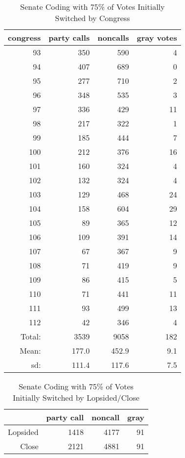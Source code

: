 \documentclass[12pt]{article}
\begin{document}
\begin{table}[ht]
	\centering
	\caption{Senate Coding with 75\% of Votes Initially Switched by Congress}
	\begin{tabular}{rrrr}
		\hline
		congress & party calls & noncalls & gray votes \\
		\hline
		93 & 350 & 590 &   4 \\
		94 & 407 & 689 &   0 \\
		95 & 277 & 710 &   2 \\
		96 & 348 & 535 &   3 \\
		97 & 336 & 429 &  11 \\
		98 & 217 & 322 &   1 \\
		99 & 185 & 444 &   7 \\
		100 & 212 & 376 &  16 \\
		101 & 160 & 324 &   4 \\
		102 & 132 & 324 &   4 \\
		103 & 129 & 468 &  24 \\
		104 & 158 & 604 &  29 \\
		105 &  89 & 365 &  12 \\
		106 & 109 & 391 &  14 \\
		107 &  67 & 367 &   9 \\
		108 &  71 & 419 &   9 \\
		109 &  86 & 415 &   5 \\
		110 &  71 & 441 &  11 \\
		111 &  93 & 499 &  13 \\
		112 &  42 & 346 &   4 \\
		\hline
		Total: & 3539 & 9058 & 182 \\
		Mean: & 177.0 & 452.9 & 9.1 \\
		sd: & 111.4 & 117.6 & 7.5 \\
		\hline
	\end{tabular}
\end{table}

\begin{table}[ht]
	\centering
	\caption{Senate Coding with 75\% of Votes Initially Switched by Lopsided/Close}
	\begin{tabular}{rrrr}
		\hline
		& party call  & noncall & gray \\
		\hline
		Lopsided & 1418 & 4177 & 91 \\
		Close & 2121 & 4881 & 91 \\
		\hline
	\end{tabular}
\end{table}
\end{document}
